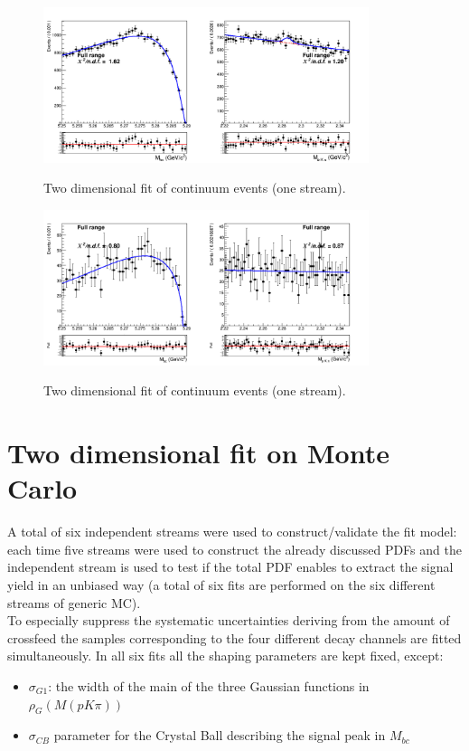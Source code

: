 \begin{figure}
{\includegraphics[width=0.85\textwidth]{04-SimultaneousFit/figs/stream0corrLambddaC_total_continuum_2DFit.png}}
\caption{Two dimensional fit of  continuum events (one stream).}
\label{fig:stream0_neutral_corrLambddaC_total_continuum_2DFit_Novosibirsk}
\end{figure}

\begin{figure}
{\includegraphics[width=0.85\textwidth]{04-SimultaneousFit/figs/stream0_anticorrLambddaC_total_continuum_2DFit_Argus.png}}
\caption{Two dimensional fit of  continuum events (one stream).}
\label{fig:stream0_neutral_anticorrLambddaC_total_continuum_2DFit}
\end{figure}


\newpage

\section{Two dimensional fit on Monte Carlo}\label{MC2D_Fit}

A total of six independent streams were used to construct/validate the fit model: each time five streams were 
used to construct the already discussed PDFs and the independent stream is used to test if the total PDF enables to extract 
the signal yield in an unbiased way (a total of six fits are performed on the six different streams of generic MC).\\
To especially suppress the systematic uncertainties deriving from the amount of crossfeed the samples corresponding to the four
different decay channels are fitted simultaneously.
In all six fits all the shaping parameters are kept fixed, except:
\begin{itemize}
    \item $\sigma_{G1}$: the width of the main of the three Gaussian functions in $\rho_G(M(p K \pi))$
    \item $\sigma_{CB}$ parameter for the Crystal Ball describing the signal peak in $M_{bc}$
\end{itemize}

